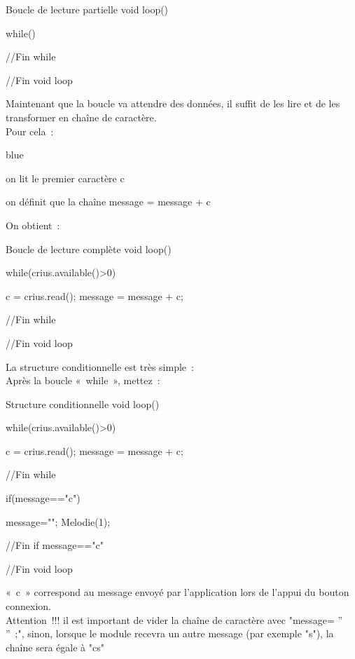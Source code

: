 \begin{Cpp}{Boucle de lecture partielle}
 void loop() {
 
    while() {
    
    }//Fin while

 }//Fin void loop

\end{Cpp}

Maintenant que la boucle va attendre des données, il suffit de les lire et de les transformer en chaîne de caractère. \\
Pour cela : \\

\begin{items}{blue}{\Triangle}
    \item on lit le premier caractère c
    \item on définit que la chaîne message = message + c 
\end{items}
On obtient :

\begin{Cpp}{Boucle de lecture complète}
 void loop() {
 
    while(crius.available()>0) {
    
        c = crius.read();
        message = message + c;
    }//Fin while

 }//Fin void loop

\end{Cpp}

La structure conditionnelle est très simple : \\
Après la boucle « while », mettez : \\

\begin{Cpp}{Structure conditionnelle}
 void loop() {
 
    while(crius.available()>0) {
    
        c = crius.read();
        message = message + c;
    }//Fin while
    
    if(message=="c") {
    
        message="";
        Melodie(1);
    }//Fin if message=="c"

 }//Fin void loop

\end{Cpp}

« c » correspond au message envoyé par l'application lors de l'appui du bouton connexion.\\

{\color{red} Attention !!! il est important de vider la chaîne de caractère avec "message= '' '' ;", sinon, lorsque le module recevra un autre message (par exemple "s"), la chaîne sera égale à "cs"} \\

